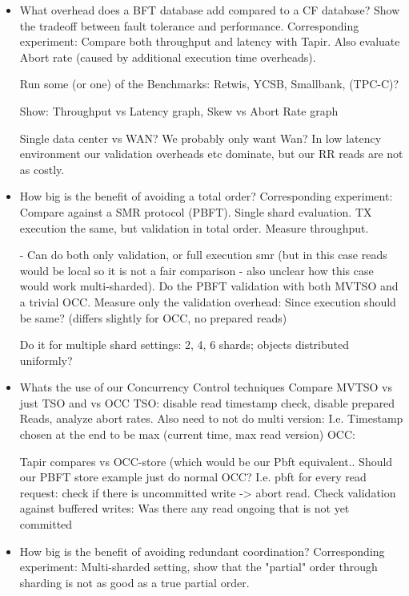\begin{itemize}
\item What overhead does a BFT database add compared to a CF database? Show the tradeoff between fault tolerance and performance.
Corresponding experiment: Compare both throughput and latency with Tapir. Also evaluate Abort rate (caused by additional execution time overheads).

Run some (or one) of the Benchmarks: Retwis, YCSB, Smallbank, (TPC-C)?

Show: Throughput vs Latency graph, Skew vs Abort Rate graph

Single data center vs WAN? We probably only want Wan? In low latency environment our validation overheads etc dominate, but our RR reads are not as costly.





\item How big is the benefit of avoiding a total order?
Corresponding experiment: Compare against a SMR protocol (PBFT). Single shard evaluation. TX execution the same, but validation in total order. Measure throughput.

- Can do both only validation, or full execution smr (but in this case reads would be local so it is not a fair comparison - also unclear how this case would work multi-sharded).
Do the PBFT validation with both MVTSO and a trivial OCC. Measure only the validation overhead: Since execution should be same? (differs slightly for OCC, no prepared reads)

Do it for multiple shard settings: 2, 4, 6 shards; objects distributed uniformly?



\item Whats the use of our Concurrency Control techniques
Compare MVTSO vs just TSO and vs OCC
TSO: disable read timestamp check, disable prepared Reads, analyze abort rates. Also need to not do multi version: I.e. Timestamp chosen at the end to be max (current time, max read version)
OCC: 

Tapir compares vs OCC-store (which would be our Pbft equivalent.. Should our PBFT store example just do normal OCC? I.e. pbft for every read request: check if there is uncommitted write -> abort read. Check validation against buffered writes: 
 Was there any read ongoing that is not yet committed

\item How big is the benefit of avoiding redundant coordination?
Corresponding experiment: Multi-sharded setting, show that the "partial" order through sharding is not as good as a true partial order.


\end{itemize}
